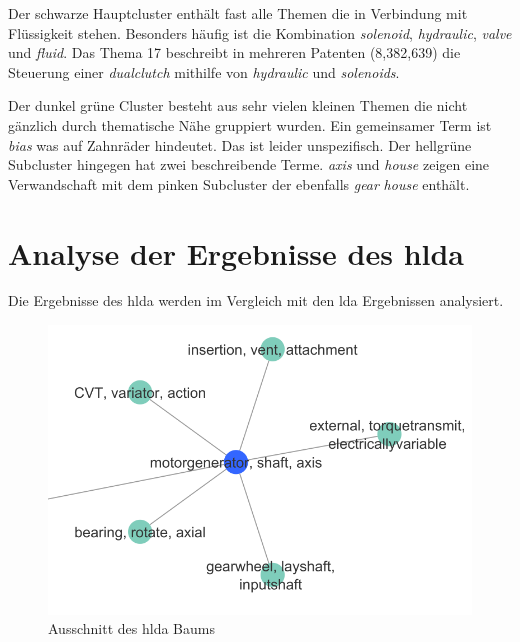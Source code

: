 Der schwarze Hauptcluster enthält fast alle Themen die in Verbindung mit Flüssigkeit stehen. Besonders häufig ist die Kombination \emph{solenoid}, \emph{hydraulic}, \emph{valve} und \emph{fluid}. Das Thema 17 beschreibt in mehreren Patenten (8,382,639) die Steuerung einer \emph{dualclutch} mithilfe von \emph{hydraulic} und \emph{solenoids}.

Der dunkel grüne Cluster besteht aus sehr vielen kleinen Themen die nicht gänzlich durch thematische Nähe gruppiert wurden. Ein gemeinsamer Term ist \emph{bias} was auf Zahnräder hindeutet. Das ist leider unspezifisch. Der hellgrüne Subcluster hingegen hat zwei beschreibende Terme. \emph{axis} und \emph{house} zeigen eine Verwandschaft mit dem pinken Subcluster der ebenfalls \emph{gear} \emph{house} enthält.
 
 
 
 
 
 
 
 


\section{Analyse der Ergebnisse des \gls{hlda}}

Die Ergebnisse des \gls{hlda} werden im Vergleich mit den \gls{lda} Ergebnissen analysiert.

\begin{figure}[htpb]
	\centering
	\includegraphics[scale=0.5,keepaspectratio=true]{img/hldamotorgenerator.png}
	\caption{
		Ausschnitt des \gls{hlda} Baums
	}
	\label{fig:hlda_motorgenerator}
\end{figure}



